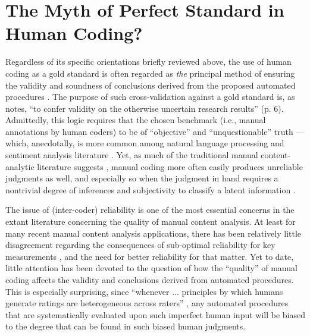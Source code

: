 \documentclass[man, 12pt, a4paper, nolmodern, noextraspace]{apa6}
\begin{document}
\section{The Myth of Perfect Standard in Human Coding?}

    Regardless of its specific orientations briefly reviewed above, the use of human coding as a gold standard is often regarded as \textit{the} principal method of ensuring the validity and soundness of conclusions derived from the proposed automated procedures \parencites[e.g., ][]{grimmer2013text, dimaggio2015adapting}. The purpose of such cross-validation against a gold standard is, as \textcite{Krippendorff2008validity} notes, \enquote{to confer validity on the otherwise uncertain research results} (p. 6). Admittedly, this logic requires that the chosen benchmark (i.e., manual annotations by human coders) to be of \enquote{objective} and \enquote{unquestionable} truth --- which, anecdotally, is more common among natural language processing and sentiment analysis literature \parencites[][]{dimaggio2015adapting}. Yet, as much of the traditional manual content-analytic literature suggests \parencites[e.g.,][]{krippendorff2004reliability, hayes2007answering, lombard2002content, ennser2018impact}, manual coding more often easily produces unreliable judgments as well, and especially so when the judgment in hand requires a nontrivial degree of inferences and subjectivity to classify a latent information \parencites[][]{riff2014analyzing, Krippendorff2013}.       
    
    The issue of (inter-coder) reliability is one of the most essential concerns in the extant literature concerning the quality of manual content analysis. At least for many recent manual content analysis applications, there has been relatively little disagreement regarding the consequences of sub-optimal reliability for key measurements \parencites[][]{krippendorff2004reliability, Krippendorff2013}, and the need for better reliability for that matter. Yet to date, little attention has been devoted to the question of how the \enquote{quality} of manual coding affects the validity and conclusions derived from automated procedures. This is especially surprising, since \enquote{whenever ... principles by which humans generate ratings are heterogeneous across raters} \parencites[][p. 4]{dimaggio2015adapting}, any automated procedures that are systematically evaluated upon such imperfect human input will be biased to the degree that can be found in such biased human judgments. 
    
\end{document}
